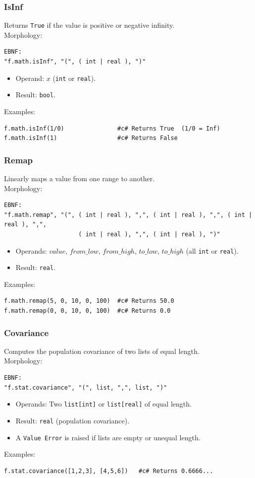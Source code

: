\subsubsection{IsInf}
Returns \texttt{True} if the value is positive or negative infinity. \\
Morphology:
\begin{verbatim}
EBNF:
"f.math.isInf", "(", ( int | real ), ")"
\end{verbatim}
\begin{itemize}
\item Operand: $x$ (\texttt{int} or \texttt{real}).
\item Result: \texttt{bool}.
\end{itemize}
Examples:
\begin{verbatim}
f.math.isInf(1/0)               #c# Returns True  (1/0 = Inf)
f.math.isInf(1)                 #c# Returns False
\end{verbatim}

\subsubsection{Remap}
Linearly maps a value from one range to another. \\
Morphology:
\begin{verbatim}
EBNF:
"f.math.remap", "(", ( int | real ), ",", ( int | real ), ",", ( int | real ), ",",
                     ( int | real ), ",", ( int | real ), ")"
\end{verbatim}
\begin{itemize}
\item Operands: $value$, $from\_low$, $from\_high$, $to\_low$, $to\_high$ (all \texttt{int} or \texttt{real}).
\item Result: \texttt{real}.
\end{itemize}
Examples:
\begin{verbatim}
f.math.remap(5, 0, 10, 0, 100)  #c# Returns 50.0
f.math.remap(0, 0, 10, 0, 100)  #c# Returns 0.0
\end{verbatim}

\subsubsection{Covariance}
Computes the population covariance of two lists of equal length. \\
Morphology:
\begin{verbatim}
EBNF:
"f.stat.covariance", "(", list, ",", list, ")"
\end{verbatim}
\begin{itemize}
\item Operands: Two \texttt{list[int]} or \texttt{list[real]} of equal length.
\item Result: \texttt{real} (population covariance).
\item A \texttt{Value Error} is raised if lists are empty or unequal length.
\end{itemize}
Examples:
\begin{verbatim}
f.stat.covariance([1,2,3], [4,5,6])   #c# Returns 0.6666...
\end{verbatim}

